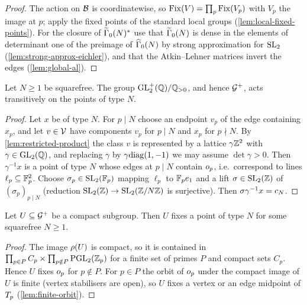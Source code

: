 \begin{proof}
The action on $\mathcal{B}$ is coordinatewise, so
$\mathrm{Fix}(V) = \prod_p \mathrm{Fix}(V_p)$ with $V_p$ the image at $p$; apply
the fixed points of the standard local groups
(\cref{lem:local-fixed-points}). For the closure of $\GammaZeroStar[lift]{N}$
use that $\GammaZero[lift]{N}$ is dense in the elements of determinant one
of the preimage of $\GammaZero[ad]{N}$ by strong approximation for
$\SL{2}{}$ (\cref{lem:strong-approx-eichler}), and that the Atkin--Lehner
matrices invert the edges (\cref{lem:global-al}).
\end{proof}

\begin{lemma}\label{lem:transitive}
Let $N \geq 1$ be squarefree. The group $\mathrm{GL}_{2}^{+}(\mathbb{Q})/\mathbb{Q}_{>0}$, and hence
$\mathcal{G}^{+}$, acts transitively on the points of type $N$.
\end{lemma}

\begin{proof}
Let $x$ be of type $N$. For $p \mid N$ choose an endpoint $v_p$ of the edge
containing $x_p$, and let $v \in \mathcal{V}$ have components $v_p$
for $p \mid N$ and $x_p$ for $p \nmid N$. By \cref{lem:restricted-product}
the class $v$ is represented by a lattice $\gamma\mathbb{Z}^{2}$ with
$\gamma \in \GL{2}{\QQ}$, and replacing $\gamma$ by $\gamma\mathrm{diag}(1,-1)$
we may assume $\det\gamma > 0$. Then $\gamma^{-1}x$ is a point of type $N$
whose edges at $p \mid N$ contain $o_{p}$, i.e.\ correspond to
lines $\ell_p \subseteq \mathbb{F}_{p}^{2}$. Choose $\sigma_p \in
\SL{2}{\FF{p}}$ mapping $\ell_p$ to $\mathbb{F}_{p}e_{1}$ and a lift
$\sigma \in \SL{2}{\ZZ}$ of $(\sigma_p)_{p \mid N}$ (reduction
$\SL{2}{\ZZ} \to \SL{2}{\ResidueRing{N}}$ is surjective). Then
$\sigma\gamma^{-1}x = c_{N}$.
\end{proof}

\begin{lemma}
\label{lem:compact-fixes-type}
Let $U \subseteq \mathcal{G}^{+}$ be a compact subgroup. Then $U$ fixes a
point of type $N$ for some squarefree $N \geq 1$.
\end{lemma}

\begin{proof}
The image $\rho(U)$ is compact, so it is contained in
$\prod_{p \in P} C_p \times \prod_{p \notin P}\PGL{2}{\pAdicIntegers{p}}$ for a
finite set of primes $P$ and compact sets $C_p$. Hence $U$ fixes
$o_{p}$ for $p \notin P$. For $p \in P$ the orbit of
$o_{p}$ under the compact image of $U$ is finite (vertex
stabilisers are open), so $U$ fixes a vertex or an edge midpoint of
$T_{p}$ (\cref{lem:finite-orbit}).
\end{proof}

